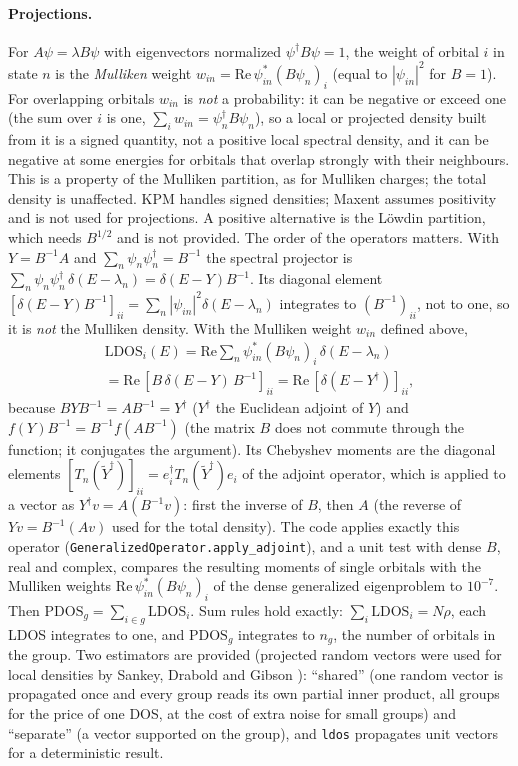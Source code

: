 \documentclass[reprint,nofootinbib,superscriptaddress,amsmath,amssymb,aps,prb,floatfix]{revtex4-2}
\begin{document}
\paragraph*{Projections.}
\label{sec:proj}
For $A\psi=\lambda B\psi$ with eigenvectors normalized $\psi^\dagger B\psi=1$, the weight of orbital $i$ in state $n$ is the \emph{Mulliken} weight $w_{in}=\mathrm{Re}\,\psi_{in}^*(B\psi_n)_i$ \cite{mulliken} (equal to $|\psi_{in}|^2$ for $B=1$).
For overlapping orbitals $w_{in}$ is \emph{not} a probability: it can be negative or exceed one (the sum over $i$ is one, $\sum_iw_{in}=\psi_n^\dagger B\psi_n$), so a local or projected density built from it is a signed quantity, not a positive local spectral density, and it can be negative at some energies for orbitals that overlap strongly with their neighbours. This is a property of the Mulliken partition, as for Mulliken charges; the total density is unaffected. KPM handles signed densities; Maxent assumes positivity and is not used for projections. A positive alternative is the L\"owdin partition, which needs $B^{1/2}$ and is not provided.
The order of the operators matters. With $Y=B^{-1}A$ and $\sum_n\psi_n\psi_n^\dagger=B^{-1}$ the spectral projector is $\sum_n\psi_n\psi_n^\dagger\,\delta(E-\lambda_n)=\delta(E-Y)B^{-1}$. Its diagonal element $[\delta(E-Y)B^{-1}]_{ii}=\sum_n|\psi_{in}|^2\delta(E-\lambda_n)$ integrates to $(B^{-1})_{ii}$, not to one, so it is \emph{not} the Mulliken density. With the Mulliken weight $w_{in}$ defined above,
\begin{multline}
\mathrm{LDOS}_i(E)=\mathrm{Re}\sum_n\psi_{in}^*(B\psi_n)_i\,\delta(E-\lambda_n)\\=\mathrm{Re}\,[B\,\delta(E-Y)\,B^{-1}]_{ii}=\mathrm{Re}\,[\delta(E-Y^\dagger)]_{ii},
\end{multline}
because $BYB^{-1}=AB^{-1}=Y^\dagger$ ($Y^\dagger$ the Euclidean adjoint of $Y$) and $f(Y)B^{-1}=B^{-1}f(AB^{-1})$ (the matrix $B$ does not commute through the function; it conjugates the argument). Its Chebyshev moments are the diagonal elements $[T_n(\tilde Y^\dagger)]_{ii}=e_i^\dagger T_n(\tilde Y^\dagger)e_i$ of the adjoint operator, which is applied to a vector as $Y^\dagger v=A(B^{-1}v)$: first the inverse of $B$, then $A$ (the reverse of $Yv=B^{-1}(Av)$ used for the total density). The code applies exactly this operator (\texttt{GeneralizedOperator.apply\_adjoint}), and a unit test with dense $B$, real and complex, compares the resulting moments of single orbitals with the Mulliken weights $\mathrm{Re}\,\psi_{in}^*(B\psi_n)_i$ of the dense generalized eigenproblem to $10^{-7}$.
Then $\mathrm{PDOS}_g=\sum_{i\in g}\mathrm{LDOS}_i$.
Sum rules hold exactly: $\sum_i\mathrm{LDOS}_i=N\rho$, each LDOS integrates to one, and $\mathrm{PDOS}_g$ integrates to $n_g$, the number of orbitals in the group.
Two estimators are provided (projected random vectors were used for local densities by Sankey, Drabold and Gibson \cite{sankey1994}): ``shared'' (one random vector is propagated once and every group reads its own partial inner product, all groups for the price of one DOS, at the cost of extra noise for small groups) and ``separate'' (a vector supported on the group), and \texttt{ldos} propagates unit vectors for a deterministic result.
\end{document}
